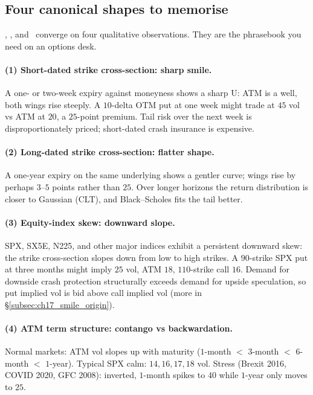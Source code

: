 \subsection{Four canonical shapes to memorise}
\label{subsec:ch17_four_shapes}

\citeBennett, \citeNatenberg, and \citeHull\ converge on four
qualitative observations. They are the phrasebook you need on an
options desk.

\paragraph{(1) Short-dated strike cross-section: sharp smile.}
A one- or two-week expiry against moneyness shows a sharp U: ATM
is a well, both wings rise steeply. A $10$-delta OTM put at one
week might trade at $45$ vol vs ATM at $20$, a $25$-point
premium. Tail risk over the next week is disproportionately
priced; short-dated crash insurance is expensive.

\paragraph{(2) Long-dated strike cross-section: flatter shape.}
A one-year expiry on the same underlying shows a gentler curve;
wings rise by perhaps $3$--$5$ points rather than $25$. Over
longer horizons the return distribution is closer to Gaussian
(CLT), and Black--Scholes fits the tail better.

\paragraph{(3) Equity-index skew: downward slope.}
SPX, SX5E, N225, and other major indices exhibit a persistent
downward skew: the strike cross-section slopes down from low to
high strikes. A $90$-strike SPX put at three months might imply
$25$ vol, ATM $18$, $110$-strike call $16$. Demand for downside
crash protection structurally exceeds demand for upside
speculation, so put implied vol is bid above call implied vol
(more in \S\ref{subsec:ch17_smile_origin}).

\paragraph{(4) ATM term structure: contango vs backwardation.}
Normal markets: ATM vol slopes up with maturity
($1$-month $<$ $3$-month $<$ $6$-month $<$ $1$-year). Typical SPX
calm: $14, 16, 17, 18$ vol. Stress (Brexit 2016, COVID 2020,
GFC 2008): inverted, $1$-month spikes to $40$ while $1$-year only
moves to $25$.

